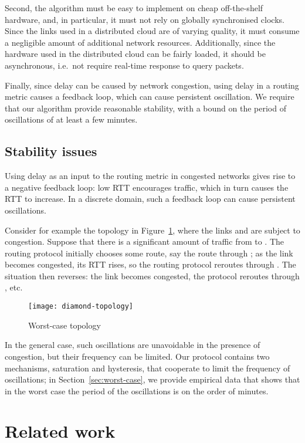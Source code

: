 \documentclass[conference,letterpaper]{IEEEtran}
\begin{document}
Second, the algorithm must be easy to implement on cheap off-the-shelf
hardware, and, in particular, it must not rely on globally
synchronised clocks.  Since the links used in a distributed cloud are
of varying quality, it must consume a negligible amount of additional
network resources.  Additionally, since the hardware used in the
distributed cloud can be fairly loaded, it should be asynchronous,
i.e.\ not require real-time response to query packets.

Finally, since delay can be caused by network congestion, using delay
in a routing metric causes a feedback loop, which can cause persistent
oscillation.  We require that our algorithm provide reasonable
stability, with a bound on the period of oscillations of at least
a few minutes.

\subsection{Stability issues} \label{sec:stability}

Using delay as an input to the routing metric in congested networks
gives rise to a negative feedback loop: low RTT encourages traffic,
which in turn causes the RTT to increase.  In a discrete domain, such
a feedback loop can cause persistent oscillations.

Consider for example the topology in Figure~\ref{fig:diamond-topology},
where the links  and  are subject to congestion.
Suppose that there is a significant amount of traffic from  to .
The routing protocol initially chooses some route, say the route
through ; as the link  becomes congested, its RTT rises,
so the routing protocol reroutes through .  The situation then
reverses: the link  becomes congested, the protocol reroutes
through , etc.

\begin{figure}[htb]
\centering
\texttt{[image: diamond-topology]}
\caption{Worst-case topology}
\label{fig:diamond-topology}
\end{figure}

In the general case, such oscillations are unavoidable in the presence
of congestion, but their frequency can be limited.  Our protocol
contains two mechanisms, saturation and hysteresis, that cooperate to
limit the frequency of oscillations; in Section~\ref{sec:worst-case},
we provide empirical data that shows that in the worst case the period
of the oscillations is on the order of minutes.

\section{Related work}
\end{document}
